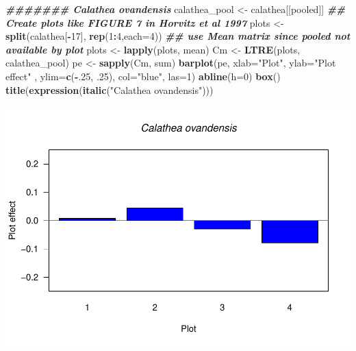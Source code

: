 \documentclass[
]{book}
\newenvironment{Shaded}{\begin{snugshade}}{\end{snugshade}}
\newcommand{\AttributeTok}[1]{\textcolor[rgb]{0.13,0.29,0.53}{#1}}
\newcommand{\DecValTok}[1]{\textcolor[rgb]{0.00,0.00,0.81}{#1}}
\newcommand{\DocumentationTok}[1]{\textcolor[rgb]{0.56,0.35,0.01}{\textbf{\textit{#1}}}}
\newcommand{\FunctionTok}[1]{\textcolor[rgb]{0.13,0.29,0.53}{\textbf{#1}}}
\newcommand{\NormalTok}[1]{#1}
\newcommand{\OtherTok}[1]{\textcolor[rgb]{0.56,0.35,0.01}{#1}}
\newcommand{\SpecialCharTok}[1]{\textcolor[rgb]{0.81,0.36,0.00}{\textbf{#1}}}
\newcommand{\StringTok}[1]{\textcolor[rgb]{0.31,0.60,0.02}{#1}}
\theoremstyle{definition}
\theoremstyle{definition}
\theoremstyle{definition}
\theoremstyle{definition}
\theoremstyle{remark}
\begin{document}
\begin{Shaded}
\begin{Highlighting}[]
\DocumentationTok{\#\#\#\#\#\#\#  Calathea ovandensis}
\NormalTok{calathea\_pool }\OtherTok{\textless{}{-}}\NormalTok{ calathea[[}\StringTok{\textquotesingle{}pooled\textquotesingle{}}\NormalTok{]]}
\DocumentationTok{\#\# Create plots like FIGURE 7 in Horvitz et al 1997}
\NormalTok{plots }\OtherTok{\textless{}{-}} \FunctionTok{split}\NormalTok{(calathea[}\SpecialCharTok{{-}}\DecValTok{17}\NormalTok{], }\FunctionTok{rep}\NormalTok{(}\DecValTok{1}\SpecialCharTok{:}\DecValTok{4}\NormalTok{,}\AttributeTok{each=}\DecValTok{4}\NormalTok{))}
\DocumentationTok{\#\# use Mean matrix since pooled not available by plot}
\NormalTok{plots }\OtherTok{\textless{}{-}} \FunctionTok{lapply}\NormalTok{(plots, mean)}
\NormalTok{Cm }\OtherTok{\textless{}{-}} \FunctionTok{LTRE}\NormalTok{(plots, calathea\_pool)}
\NormalTok{pe }\OtherTok{\textless{}{-}} \FunctionTok{sapply}\NormalTok{(Cm, sum)}
\FunctionTok{barplot}\NormalTok{(pe, }\AttributeTok{xlab=}\StringTok{"Plot"}\NormalTok{, }\AttributeTok{ylab=}\StringTok{"Plot effect"}\NormalTok{ , }\AttributeTok{ylim=}\FunctionTok{c}\NormalTok{(}\SpecialCharTok{{-}}\NormalTok{.}\DecValTok{25}\NormalTok{, .}\DecValTok{25}\NormalTok{),}
\AttributeTok{col=}\StringTok{"blue"}\NormalTok{, }\AttributeTok{las=}\DecValTok{1}\NormalTok{)}
\FunctionTok{abline}\NormalTok{(}\AttributeTok{h=}\DecValTok{0}\NormalTok{)}
\FunctionTok{box}\NormalTok{()}
\FunctionTok{title}\NormalTok{(}\FunctionTok{expression}\NormalTok{(}\FunctionTok{italic}\NormalTok{(}\StringTok{"Calathea ovandensis"}\NormalTok{)))}
\end{Highlighting}
\end{Shaded}

\includegraphics{Diagnostico_Poblacional_files/figure-latex/unnamed-chunk-24-1.pdf}
\end{document}
